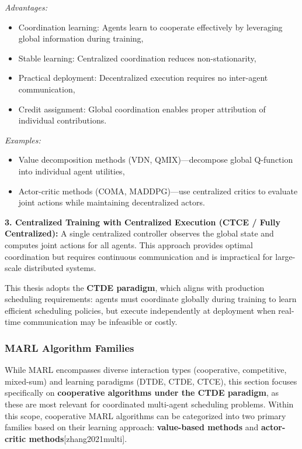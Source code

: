 \textit{Advantages:}
\begin{itemize}
    \item Coordination learning: Agents learn to cooperate effectively by leveraging global information during training,
    \item Stable learning: Centralized coordination reduces non-stationarity,
    \item Practical deployment: Decentralized execution requires no inter-agent communication,
    \item Credit assignment: Global coordination enables proper attribution of individual contributions.
\end{itemize}

\textit{Examples:}
\begin{itemize}
    \item Value decomposition methods (VDN, QMIX)—decompose global Q-function into individual agent utilities,
    \item Actor-critic methods (COMA, MADDPG)—use centralized critics to evaluate joint actions while maintaining decentralized actors.
\end{itemize}

\textbf{3. Centralized Training with Centralized Execution (CTCE / Fully Centralized):} A single centralized controller observes the global state and computes joint actions for all agents. This approach provides optimal coordination but requires continuous communication and is impractical for large-scale distributed systems.

This thesis adopts the \textbf{CTDE paradigm}, which aligns with production scheduling requirements: agents must coordinate globally during training to learn efficient scheduling policies, but execute independently at deployment when real-time communication may be infeasible or costly.

\subsubsection{MARL Algorithm Families}
\label{sec:marl_algorithms}

While MARL encompasses diverse interaction types (cooperative, competitive, mixed-sum) and learning paradigms (DTDE, CTDE, CTCE), this section focuses specifically on \textbf{cooperative algorithms under the CTDE paradigm}, as these are most relevant for coordinated multi-agent scheduling problems. Within this scope, cooperative MARL algorithms can be categorized into two primary families based on their learning approach: \textbf{value-based methods} and \textbf{actor-critic methods}[zhang2021multi].

